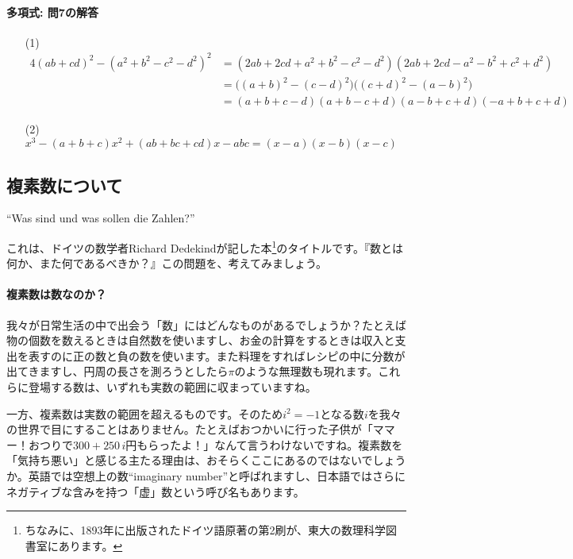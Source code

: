 \paragraph{多項式: 問7の解答}
\begin{itemize}
\item[(1)] \ \\[-4zw]
\begin{align*}
4(ab+cd)^2-(a^2+b^2-c^2-d^2)^2
&= (2ab+2cd+a^2+b^2-c^2-d^2)(2ab+2cd-a^2-b^2+c^2+d^2) \\
&= \bigl((a+b)^2-(c-d)^2\bigr)\bigl((c+d)^2-(a-b)^2\bigr) \\
&= (a+b+c-d)(a+b-c+d)(a-b+c+d)(-a+b+c+d)
\end{align*}
\item[(2)] $x^3-(a+b+c)x^2+(ab+bc+cd)x-abc = (x-a)(x-b)(x-c)$
\end{itemize}



\subsection{複素数について}
\begin{citation}
{}``Was sind und was sollen die Zahlen?''
\end{citation}

これは、ドイツの数学者Richard Dedekindが記した本\footnote{ちなみに、1893年に出版されたドイツ語原著の第2刷が、東大の数理科学図書室にあります。}のタイトルです。『数とは何か、また何であるべきか？』この問題を、考えてみましょう。

\paragraph{複素数は数なのか？}

我々が日常生活の中で出会う「数」にはどんなものがあるでしょうか？たとえば物の個数を数えるときは自然数を使いますし、お金の計算をするときは収入と支出を表すのに正の数と負の数を使います。また料理をすればレシピの中に分数が出てきますし、円周の長さを測ろうとしたら$\pi$のような無理数も現れます。これらに登場する数は、いずれも実数の範囲に収まっていますね。

一方、複素数は実数の範囲を超えるものです。そのため$i^2=-1$となる数$i$を我々の世界で目にすることはありません。たとえばおつかいに行った子供が「ママー！\negthinspace おつりで$300+250\,i$円もらったよ！」なんて言うわけないですね。複素数を「気持ち悪い」と感じる主たる理由は、おそらくここにあるのではないでしょうか。英語では空想上の数``imaginary number''と呼ばれますし、日本語ではさらにネガティブな含みを持つ「虚」数という呼び名もあります。

